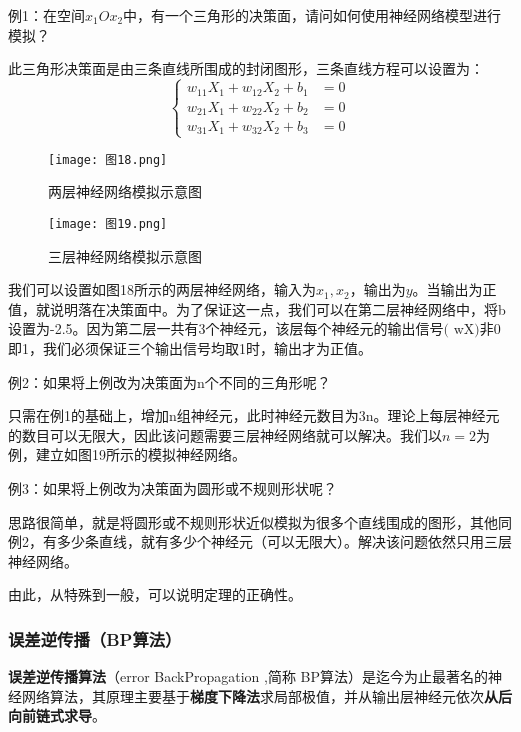 例1：在空间$x_{1}Ox_{2}$中，有一个三角形的决策面，请问如何使用神经网络模型进行模拟？

此三角形决策面是由三条直线所围成的封闭图形，三条直线方程可以设置为：
\begin{equation}\begin{cases}w_{11}X_1+w_{12}X_2+b_1&=0\\[2ex]w_{21}X_1+w_{22}X_2+b_2&=0\\[2ex]w_{31}X_1+w_{32}X_2+b_3&=0\end{cases}\end{equation}

\begin{figure}[h]
	\centering
	\begin{minipage}[b]{0.7\textwidth}
		\centering
		\texttt{[image: 图18.png]}
		\caption{两层神经网络模拟示意图}
		\label{fig:image1}
	\end{minipage}
	\hspace{0.05\textwidth} %
	\begin{minipage}[b]{0.7\textwidth}
		\centering
		\texttt{[image: 图19.png]}
		\caption{三层神经网络模拟示意图}
		\label{fig:image2}
	\end{minipage}
\end{figure}

我们可以设置如图18所示的两层神经网络，输入为$x_1,x_2$，输出为$y$。当输出为正值，就说明落在决策面中。为了保证这一点，我们可以在第二层神经网络中，将b设置为-2.5。因为第二层一共有3个神经元，该层每个神经元的输出信号$\text{( wX)}$非0即1，我们必须保证三个输出信号均取1时，输出才为正值。

例2：如果将上例改为决策面为n个不同的三角形呢？

只需在例1的基础上，增加n组神经元，此时神经元数目为3n。理论上每层神经元的数目可以无限大，因此该问题需要三层神经网络就可以解决。我们以$n=2$为例，建立如图19所示的模拟神经网络。

例3：如果将上例改为决策面为圆形或不规则形状呢？

思路很简单，就是将圆形或不规则形状近似模拟为很多个直线围成的图形，其他同例2，有多少条直线，就有多少个神经元（可以无限大）。解决该问题依然只用三层神经网络。

由此，从特殊到一般，可以说明定理的正确性。

\subsubsection{误差逆传播（BP算法）}
\textbf{误差逆传播算法}（error BackPropagation ,简称 BP算法）是迄今为止最著名的神经网络算法，其原理主要基于\textbf{梯度下降法}求局部极值，并从输出层神经元依次\textbf{从后向前链式求导}。

